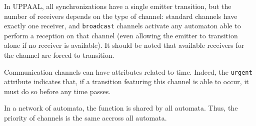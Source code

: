 \begin{definition}
In UPPAAL, all synchronizations have a single emitter transition, but the
number of receivers depends on the type of channel: standard channels have
exactly one receiver, and \texttt{broadcast} channels activate any automaton
able to perform a reception on that channel (even allowing the emitter to
transition alone if no receiver is available). It should be noted that available
receivers for the channel are forced to transition.

Communication channels can have attributes related to time. Indeed, the
\texttt{urgent} attribute indicates that, if a transition featuring this channel
is able to occur, it must do so before any time passes.

In a network of automata, the \automatachanpriorities{} function is shared by
all automata. Thus, the priority of channels is the same accross all automata.
\end{definition}

